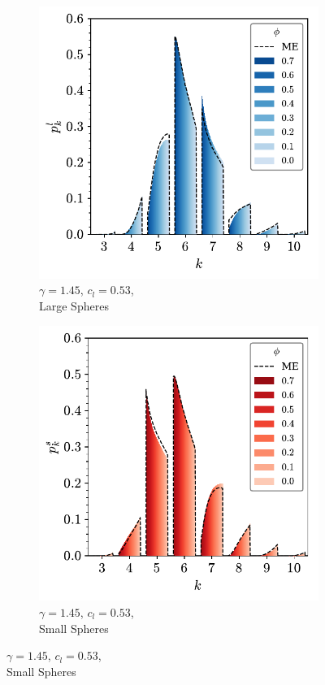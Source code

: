 \begin{figure}[bt]
     \centering
     
      \begin{subfigure}[b]{0.48\textwidth}
         \centering
         \includegraphics[width=\textwidth]{./figures/quasi2d/phi_me_l_53.pdf}
         \caption{$\gamma=1.45$, $c_l=0.53$, \\Large Spheres}
         \label{fig:bime1}
     \end{subfigure}
     \hfill
      \begin{subfigure}[b]{0.48\textwidth}
         \centering
         \includegraphics[width=\textwidth]{./figures/quasi2d/phi_me_s_53.pdf}
         \caption{$\gamma=1.45$, $c_l=0.53$, \\Small Spheres}
         \label{fig:bime2}
     \end{subfigure}
     \hfill
     

\end{figure}
